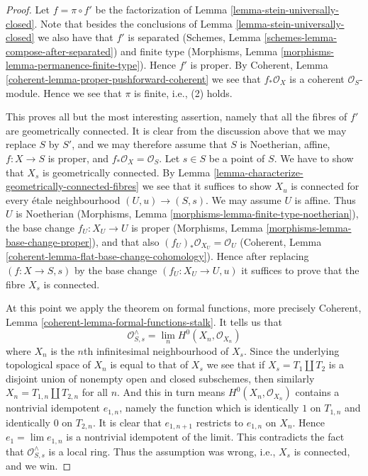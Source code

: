 \begin{proof}
Let $f = \pi \circ f'$ be the factorization of
Lemma \ref{lemma-stein-universally-closed}. Note that besides the
conclusions of Lemma \ref{lemma-stein-universally-closed} we
also have that $f'$ is separated
(Schemes, Lemma \ref{schemes-lemma-compose-after-separated})
and finite type
(Morphisms, Lemma \ref{morphisms-lemma-permanence-finite-type}).
Hence $f'$ is proper. By
Coherent, Lemma \ref{coherent-lemma-proper-pushforward-coherent}
we see that $f_*\mathcal{O}_X$ is a coherent $\mathcal{O}_S$-module.
Hence we see that $\pi$ is finite, i.e., (2) holds.

\medskip\noindent
This proves all but the most interesting assertion, namely that
all the fibres of $f'$ are geometrically connected.
It is clear from the discussion above that we may replace $S$ by $S'$,
and we may therefore assume that $S$ is Noetherian, affine,
$f : X \to S$ is proper, and $f_*\mathcal{O}_X = \mathcal{O}_S$.
Let $s \in S$ be a point of $S$. We have to show that $X_s$ is
geometrically connected. By Lemma
\ref{lemma-characterize-geometrically-connected-fibres}
we see that it suffices to show $X_u$ is connected
for every \'etale neighbourhood $(U, u) \to (S, s)$.
We may assume $U$ is affine. Thus $U$ is Noetherian
(Morphisms, Lemma \ref{morphisms-lemma-finite-type-noetherian}),
the base change $f_U : X_U \to U$ is proper
(Morphisms, Lemma \ref{morphisms-lemma-base-change-proper}),
and that also $(f_U)_*\mathcal{O}_{X_U} = \mathcal{O}_U$
(Coherent, Lemma \ref{coherent-lemma-flat-base-change-cohomology}).
Hence after replacing
$(f : X \to S, s)$ by the base change $(f_U : X_U \to U, u)$
it suffices to prove that the fibre $X_s$ is connected.

\medskip\noindent
At this point we apply the theorem on formal functions,
more precisely Coherent, Lemma \ref{coherent-lemma-formal-functions-stalk}.
It tells us that
$$
\mathcal{O}^\wedge_{S, s} =
\lim_n H^0(X_n, \mathcal{O}_{X_n})
$$
where $X_n$ is the $n$th infinitesimal neighbourhood of $X_s$.
Since the underlying topological space of $X_n$ is equal to that
of $X_s$ we see that if $X_s = T_1 \coprod T_2$ is a disjoint union
of nonempty open and closed subschemes, then similarly
$X_n = T_{1, n} \coprod T_{2, n}$ for all $n$. And this in turn means
$H^0(X_n, \mathcal{O}_{X_n})$ contains a nontrivial idempotent $e_{1, n}$,
namely the function which is identically $1$ on $T_{1, n}$ and
identically $0$ on $T_{2, n}$. It is clear that $e_{1, n + 1}$
restricts to $e_{1, n}$ on $X_n$. Hence $e_1 = \lim e_{1, n}$
is a nontrivial idempotent of the limit. This contradicts the fact
that $\mathcal{O}^\wedge_{S, s}$ is a local ring. Thus the
assumption was wrong, i.e., $X_s$ is connected, and we win.
\end{proof}

